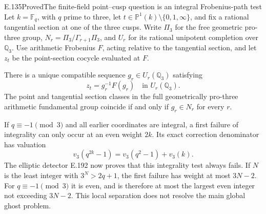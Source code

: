 \begin{result}{E.135}{Proved}{The finite-field point--cusp question is an integral Frobenius-path test}
Let $k=\mathbb F_q$, with $q$ prime to three, let
$t\in\mathbb P^1(k)\setminus\{0,1,\infty\}$, and fix a
rational tangential section at one of the three cusps.
Write $\Pi_3$ for the free geometric pro-three group,
$N_r=\Pi_3/\Gamma_{r+1}\Pi_3$, and $U_r$ for its
rational unipotent completion over $\mathbb Q_3$.
Use arithmetic Frobenius $F$, acting relative to the
tangential section, and let $z_t$ be the point-section
cocycle evaluated at $F$.

There is a unique compatible sequence
$g_r\in U_r(\mathbb Q_3)$ satisfying
\[
                 z_t=g_r^{-1}F(g_r)\quad\text{in }U_r(\mathbb Q_3).
 \tag{E.135.1}
\]
The point and tangential section classes in the full
geometrically pro-three arithmetic fundamental group
coincide if and only if $g_r\in N_r$ for every $r$.

If $q\equiv-1\pmod3$ and all earlier coordinates are
integral, a first failure of integrality can only occur
at an even weight $2k$. Its exact correction denominator
has valuation
\[
                     v_3(q^{2k}-1)=v_3(q^2-1)+v_3(k).
 \tag{E.135.2}
\]
The elliptic detector E.192 now proves that this
integrality test always fails.  If $N$ is the least
integer with $3^N>2q+1$, the first failure has weight
at most $3N-2$.  For $q\equiv-1\pmod3$ it is even,
and is therefore at most the largest even integer
not exceeding $3N-2$.
This local separation does not resolve the main
global ghost problem.
\end{result}
